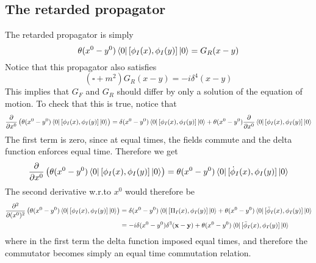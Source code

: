 \documentclass[11pt]{article}
\newcommand{\del}{\partial}
\numberwithin{equation}{section}
\begin{document}
    \subsection{The retarded propagator}
    The retarded propagator is simply 
    \begin{equation*}
        \theta(x^0 - y^0)\bra{0}[\phi_I(x), \phi_I(y) ]\ket{0} = G_R(x-y)
    \end{equation*}
    Notice that this propagator also satisfies 
    \begin{equation*}
        (\square + m^2)G_R(x-y) = -i\delta^4(x-y)
    \end{equation*}
    This implies that \(G_F\) and \(G_R\) should differ by only a solution of the equation of motion. To check that this is true, notice that 
    \begin{equation*}
        \frac{\del}{\del x^0} \left(\theta(x^0 - y^0)\bra{0}[\phi_I(x), \phi_I(y) ]\ket{0}\right) = \delta(x^0 - y^0)\bra{0}[\phi_I(x), \phi_I(y) ]\ket{0} + \theta(x^0 - y^0)\frac{\del}{\del x^0} \bra{0}[\phi_I(x), \phi_I(y) ]\ket{0}
    \end{equation*}
    The first term is zero, since at equal times, the fields commute and the delta function enforces equal time. 
    Therefore we get 
    \begin{equation*}
        \frac{\del}{\del x^0} \left(\theta(x^0 - y^0)\bra{0}[\phi_I(x), \phi_I(y) ]\ket{0}\right) = \theta(x^0 - y^0) \bra{0}[\dot{\phi}_I(x), \phi_I(y) ]\ket{0}
    \end{equation*}
    The second derivative w.r.to \(x^0\) would therefore be 
    \begin{align*}
        \frac{\del^2}{\del (x^0)^2} \left(\theta(x^0 - y^0)\bra{0}[\phi_I(x), \phi_I(y) ]\ket{0}\right) &= \delta(x^0 - y^0) \bra{0}[\Pi_I(x), \phi_I(y) ]\ket{0} + \theta(x^0 - y^0) \bra{0}[\ddot{\phi}_I(x), \phi_I(y) ]\ket{0} \\
        &= -i\delta(x^0 - y^0)\delta^3(\textbf{x} - \textbf{y}) + \theta(x^0 - y^0) \bra{0}[\ddot{\phi}_I(x), \phi_I(y) ]\ket{0} 
    \end{align*}
    where in the first term the delta function imposed equal times, and therefore the commutator becomes simply an equal time commutation relation. \\
\end{document}
